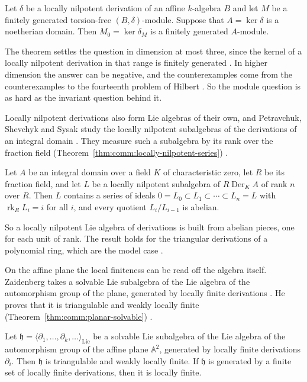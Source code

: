 \begin{theorem}\label{thm:comm:module-kernel}
Let $\delta$ be a locally nilpotent derivation of an affine $k$-algebra $B$
and let $M$ be a finitely generated torsion-free $(B,\delta)$-module.
Suppose that $A=\ker\delta$ is a noetherian domain. Then $M_{0}=\ker\delta_{M}$
is a finitely generated $A$-module.
\end{theorem}

The theorem settles the question in dimension at most three, since the
kernel of a locally nilpotent derivation in that range is finitely generated
\cite[Corollary~4.7, p.~10]{Tanaka2010ModuleDerivations}. In higher
dimension the answer can be negative, and the counterexamples come from the
counterexamples to the fourteenth problem of Hilbert
\cite[pp.~2--3]{Tanaka2010ModuleDerivations}. So the module question is as
hard as the invariant question behind it.

Locally nilpotent derivations also form Lie algebras of their own, and
Petravchuk, Shevchyk and Sysak study the locally nilpotent subalgebras of
the derivations of an integral domain \cite[p.~1]{PetravchukShevchykSysak2017}.
They measure such a subalgebra by its rank over the fraction field (Theorem~\ref{thm:comm:locally-nilpotent-series})
\cite[p.~1]{PetravchukShevchykSysak2017}.\begin{theorem}\label{thm:comm:locally-nilpotent-series}
Let $A$ be an integral domain over a field $K$ of characteristic zero, let
$R$ be its fraction field, and let $L$ be a locally nilpotent subalgebra of
$R\operatorname{Der}_{K}A$ of rank $n$ over $R$. Then $L$ contains a series
of ideals $0=L_{0}\subset L_{1}\subset\cdots\subset L_{n}=L$ with
$\operatorname{rk}_{R}L_{i}=i$ for all $i$, and every quotient
$L_{i}/L_{i-1}$ is abelian.
\end{theorem}

So a locally nilpotent Lie algebra of derivations is built from abelian
pieces, one for each unit of rank. The result holds for the triangular
derivations of a polynomial ring, which are the model case
\cite[p.~2]{PetravchukShevchykSysak2017}.

On the affine plane the local finiteness can be read off the algebra
itself. Zaidenberg takes a solvable Lie subalgebra of the Lie algebra of
the automorphism group of the plane, generated by locally finite
derivations \cite[p.~1]{Zaidenberg2026LocallyFinite}. He proves that it is
triangulable and weakly locally finite (Theorem~\ref{thm:comm:planar-solvable})
\cite[Theorem~1.2, p.~2]{Zaidenberg2026LocallyFinite}.\begin{theorem}\label{thm:comm:planar-solvable}
Let $\mathfrak{h}=\langle\partial_{1},\dots,\partial_{k},\dots\rangle_{\mathrm{Lie}}$
be a solvable Lie subalgebra of the Lie algebra of the automorphism group
of the affine plane $\mathbb{A}^{2}$, generated by locally finite
derivations $\partial_{i}$. Then $\mathfrak{h}$ is triangulable and weakly
locally finite. If $\mathfrak{h}$ is generated by a finite set of locally
finite derivations, then it is locally finite.
\end{theorem}

